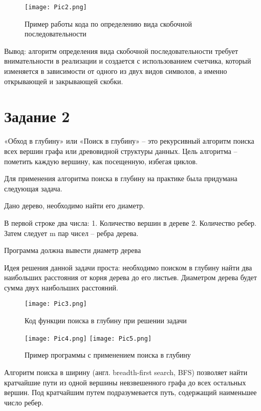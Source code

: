 \documentclass[14pt]{extreport}
\begin{document}
\begin{figure}[H]
\centerline{\texttt{[image: Pic2.png]}}
\caption{Пример работы кода по определению вида скобочной последовательности}
\label{fig12}
\end{figure}

Вывод: алгоритм определения вида скобочной последовательности требует внимательности в реализации и создается с использованием счетчика, который изменяется в зависимости от одного из двух видов символов, а именно открывающей и закрывающей скобки.

\chapter{Задание 2}

«Обход в глубину» или «Поиск в глубину» – это рекурсивный алгоритм поиска всех вершин графа или древовидной структуры данных. Цель алгоритма – пометить каждую вершину, как посещенную, избегая циклов. 

Для применения алгоритма поиска в глубину на практике была придумана следующая задача.

Дано дерево, необходимо найти его диаметр.

В первой строке два числа: 1. Количество вершин в дереве 2. Количество ребер.
Затем следует m пар чисел – ребра дерева.

Программа должна вывести диаметр дерева

Идея решения данной задачи проста: необходимо поиском в глубину найти два наибольших расстояния от корня дерева до его листьев. Диаметром дерева будет сумма двух наибольших расстояний.

\begin{figure}[H]
\centerline{\texttt{[image: Pic3.png]}}
\caption{Код функции поиска в глубину при решении задачи}
\label{fig13}
\end{figure}

\begin{figure}[H]
\texttt{[image: Pic4.png]}
\texttt{[image: Pic5.png]}
\caption{Пример программы с применением поиска в глубину}
\label{fig14}
\end{figure}

Алгоритм поиска в ширину (англ. breadth-first search, BFS) позволяет найти кратчайшие пути из одной вершины невзвешенного графа до всех остальных вершин. Под кратчайшим путем подразумевается путь, содержащий наименьшее число ребер.
\end{document}
